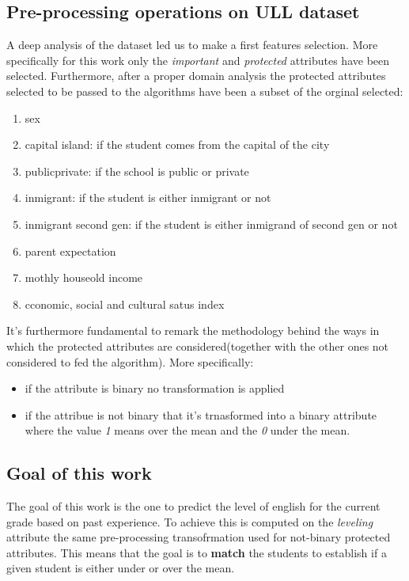 \documentclass[12pt,a4paper,openright,twoside]{book}
\begin{document}
\subsection{Pre-processing operations on ULL dataset}
A deep analysis of the dataset led us to make a first features selection. More specifically for this work only the \emph{important} and \emph{protected} attributes have been selected.
Furthermore, after a proper domain analysis the protected attributes selected to be passed to the algorithms have been a subset of the orginal selected:
\begin{enumerate}
    \item sex
    \item capital island: if the student comes from the capital of the city
    \item public\textunderscore private: if the school is public or private
    \item inmigrant: if the student is either inmigrant or not
    \item inmigrant second gen: if the student is either inmigrand of second gen or not
    \item parent expectation
    \item mothly houseold income
    \item cconomic, social and cultural satus index
\end{enumerate}
It's furthermore fundamental to remark the methodology behind the ways in which the protected attributes are considered(together with the other ones not considered to fed the algorithm).
More specifically:
\begin{itemize}
    \item if the attribute is binary no transformation is applied
    \item if the attribue is not binary that it's trnasformed into a binary attribute where the value \emph{1} means over the mean and the \emph{0} under the mean.
\end{itemize}

\subsection{Goal of this work}
The goal of this work is the one to predict the level of english for the current grade based on past experience. To achieve this is computed on the \emph{level\textunderscore ing} attribute the same pre-processing transofrmation used for not-binary protected attributes. This means that the goal is to \textbf{match} the students to establish if a given student is either under or over the mean.
\end{document}
